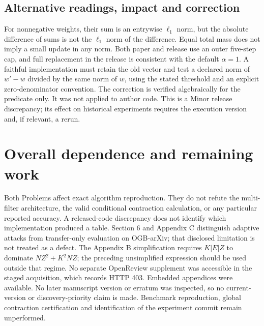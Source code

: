 \documentclass[10pt]{article}
\begin{document}
\subsection*{Alternative readings, impact and correction}
For nonnegative weights, their sum is an entrywise \(\ell_1\) norm, but the absolute difference of sums is not the \(\ell_1\) norm of the difference. Equal total mass does not imply a small update in any norm. Both paper and release use an outer five-step cap, and full replacement in the release is consistent with the default \(\alpha=1\). A faithful implementation must retain the old vector and test a declared norm of \(w'-w\) divided by the same norm of \(w\), using the stated threshold and an explicit zero-denominator convention. The correction is verified algebraically for the predicate only. It was not applied to author code. This is a Minor release discrepancy; its effect on historical experiments requires the execution version and, if relevant, a rerun.\par
\section*{Overall dependence and remaining work}
Both Problems affect exact algorithm reproduction. They do not refute the multi-filter architecture, the valid conditional contraction calculation, or any particular reported accuracy. A released-code discrepancy does not identify which implementation produced a table. Section 6 and Appendix C distinguish adaptive attacks from transfer-only evaluation on OGB-arXiv; that disclosed limitation is not treated as a defect. The Appendix B simplification requires \(K|E|Z\) to dominate \(NZ^2+K^2NZ\); the preceding unsimplified expression should be used outside that regime. No separate OpenReview supplement was accessible in the staged acquisition, which records HTTP 403. Embedded appendices were available. No later manuscript version or erratum was inspected, so no current-version or discovery-priority claim is made. Benchmark reproduction, global contraction certification and identification of the experiment commit remain unperformed.\par
\end{document}
